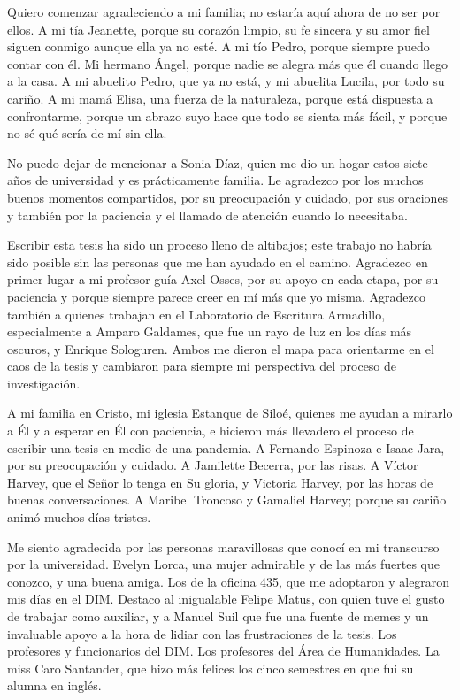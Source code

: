 \documentclass[upright, contnum]{umemoria}
\begin{document}


\begin{thanks}

Quiero comenzar agradeciendo a mi familia; no estaría aquí ahora de no ser por ellos. A mi tía Jeanette, porque su corazón limpio, su fe sincera y su amor fiel siguen conmigo aunque ella ya no esté. A mi tío Pedro, porque siempre puedo contar con él. Mi hermano Ángel, porque nadie se alegra más que él cuando llego a la casa. A mi abuelito Pedro, que ya no está, y mi abuelita Lucila, por todo su cariño. A mi mamá Elisa, una fuerza de la naturaleza, porque está dispuesta a confrontarme, porque un abrazo suyo hace que todo se sienta más fácil, y porque no sé qué sería de mí sin ella.

No puedo dejar de mencionar a Sonia Díaz, quien me dio un hogar estos siete años de universidad y es prácticamente familia. Le agradezco por los muchos buenos momentos compartidos, por su preocupación y cuidado, por sus oraciones y también por la paciencia y el llamado de atención cuando lo necesitaba. 

Escribir esta tesis ha sido un proceso lleno de altibajos; este trabajo no habría sido posible sin las personas que me han ayudado en el camino. Agradezco en primer lugar a mi profesor guía Axel Osses, por su apoyo en cada etapa, por su paciencia y porque siempre parece creer en mí más que yo misma. Agradezco también a quienes trabajan en el Laboratorio de Escritura Armadillo, especialmente a Amparo Galdames, que fue un rayo de luz en los días más oscuros, y Enrique Sologuren. Ambos me dieron el mapa para orientarme en el caos de la tesis y cambiaron para siempre mi perspectiva del proceso de investigación.

A mi familia en Cristo, mi iglesia Estanque de Siloé, quienes me ayudan a mirarlo a Él y a esperar en Él con paciencia, e hicieron más llevadero el proceso de escribir una tesis en medio de una pandemia. A Fernando Espinoza e Isaac Jara, por su preocupación y cuidado. A Jamilette Becerra, por las risas. A Víctor Harvey, que el Señor lo tenga en Su gloria, y Victoria Harvey, por las horas de buenas conversaciones. A Maribel Troncoso y Gamaliel Harvey; porque su cariño animó muchos días tristes.

Me siento agradecida por las personas maravillosas que conocí en mi transcurso por la universidad. Evelyn Lorca, una mujer admirable y de las más fuertes que conozco, y una buena amiga. Los de la oficina 435, que me adoptaron y alegraron mis días en el DIM. Destaco al inigualable Felipe Matus, con quien tuve el gusto de trabajar como auxiliar, y a Manuel Suil que fue una fuente de memes y un invaluable apoyo a la hora de lidiar con las frustraciones de la tesis. Los profesores y funcionarios del DIM. Los profesores del Área de Humanidades. La miss Caro Santander, que hizo más felices los cinco semestres en que fui su alumna en inglés. 


\end{thanks}
\end{document}
